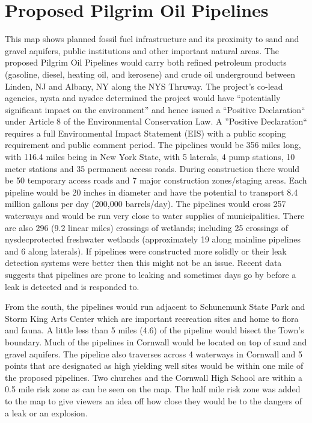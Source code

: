 \section{Proposed Pilgrim Oil Pipelines}\label{subec:pilgrim}

\label{map:proposedoilpipelines}
This map shows planned fossil fuel infrastructure and its proximity to sand and 
gravel aquifers, public institutions and other important natural areas. The 
proposed Pilgrim Oil Pipelines would carry both refined petroleum products 
(gasoline, diesel, heating oil, and kerosene) and crude oil underground between 
Linden, NJ and Albany, NY along the NYS Thruway. The project’s co-lead 
agencies, \gls{nysta} and \gls{nysdec} determined the project would have 
``potentially significant impact on the environment'' and hence issued a 
``Positive Declaration`` under Article 8 of the Environmental Conservation 
Law. A ''Positive Declaration`` requires a full Environmental Impact Statement 
(EIS) with a public scoping requirement and public comment period. The pipelines 
would be 356 miles long, with 116.4 miles being in New York State, with 5 
laterals, 4 pump stations, 10 meter stations and 35 permanent access roads. 
During construction there would be 50 temporary access roads and 7 major 
construction zones/staging areas. Each pipeline would be 20 inches in diameter 
and have the potential to transport 8.4 million gallons per day (200,000 
barrels/day). The pipelines would cross 257 waterways and would be run very 
close to water supplies of municipalities. There are also 296 (9.2 linear miles)
crossings of wetlands; including 25 crossings of \gls{nysdec}protected 
freshwater wetlands (approximately 19 along mainline pipelines and 6 along 
laterals). If pipelines were constructed more solidly or their leak detection 
systems were better then this might not be an issue. Recent data suggests that 
pipelines are prone to leaking and sometimes days go by before a leak is 
detected and is responded to.

From the south, the pipelines would run adjacent to Schunemunk State Park and 
Storm King Arts Center which are important recreation sites and home to flora 
and fauna. A little less than 5 miles (4.6) of the pipeline would bisect the 
Town’s boundary. Much of the pipelines in Cornwall would be located on top of 
sand and gravel aquifers. The pipeline also traverses across 4 waterways in 
Cornwall and 5 points that are designated as high yielding well sites would be 
within one mile of the proposed pipelines. Two churches and the Cornwall High 
School are within a 0.5 mile risk zone as can be seen on the map. The half mile 
risk zone was added to the map to give viewers an idea off how close they would 
be to the dangers of a leak or an explosion.

